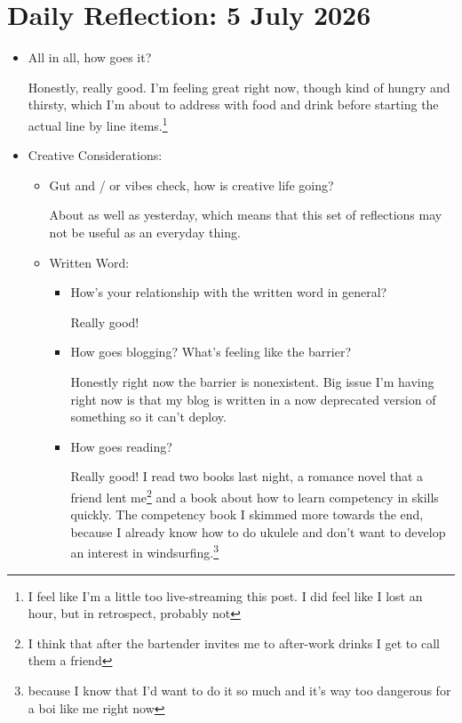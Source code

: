 \documentclass[12pt]{article}
\renewcommand{\,}{\textsuperscript{,}}
\begin{document}
\section{Daily Reflection: 5 July 2026}

\begin{itemize}

\item All in all, how goes it?

Honestly, really good. I'm feeling great right now, though kind of hungry and thirsty, which I'm about to address with food and drink before starting the actual line by line items.\footnote{I feel like I'm a little too live-streaming this post. I did feel like I lost an hour, but in retrospect, probably not}

\item Creative Considerations:

\begin{itemize}

\item Gut and / or vibes check, how is creative life going?

About as well as yesterday, which means that this set of reflections may not be useful as an everyday thing.

\item Written Word:

\begin{itemize}

\item How's your relationship with the written word in general?

Really good!

\item How goes blogging? What's feeling like the barrier?

Honestly right now the barrier is nonexistent.  
Big issue I'm having right now is that my blog is written in a now deprecated version of something so it can't deploy.

\item How goes reading?

Really good! I read two books last night, a romance novel that a friend lent me\footnote{I think that after the bartender invites me to after-work drinks I get to call them a friend} and a book about how to learn competency in skills quickly.  
The competency book I skimmed more towards the end, because I already know how to do ukulele and don't want to develop an interest in windsurfing.\footnote{because I know that I'd want to do it so much and it's way too dangerous for a boi like me right now}


\end{itemize}
\end{itemize}
\end{itemize}
\end{document}
